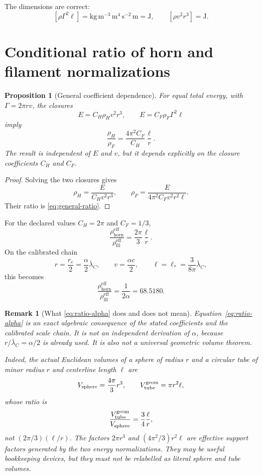 \documentclass[aps,pre,preprint,notitlepage,nofootinbib,superscriptaddress]{revtex4-2}
\newcommand{\lC}{\bar\lambda_C}
\newcommand{\re}{r_e}
\newcommand{\rhohorn}{\rho_{\mathrm{horn}}^{\mathrm{eff}}}
\newcommand{\rhofil}{\rho_{\mathrm{fil}}^{\mathrm{eff}}}
\newtheorem{proposition}{Proposition}
\newtheorem{remark}{Remark}
\begin{document}
The dimensions are correct:
\[
[\rho\Gamma^2\ell]
=
\mathrm{kg\,m^{-3}}\,
\mathrm{m^4\,s^{-2}}\,
\mathrm m
=
\mathrm J,
\qquad
[\rho v^2r^3]=\mathrm J.
\]

\section{Conditional ratio of horn and filament normalizations}
\label{sec:ratio}

\begin{proposition}[General coefficient dependence]
\label{prop:general-ratio}
For equal total energy, with \(\Gamma=2\pi rv\), the closures
\[
E=C_H\rho_Hv^2r^3,
\qquad
E=C_F\rho_F\Gamma^2\ell
\]
imply
\begin{equation}
  \boxed{
  \frac{\rho_H}{\rho_F}
  =
  \frac{4\pi^2C_F}{C_H}\frac{\ell}{r}
  }.
  \label{eq:general-ratio}
\end{equation}
The result is independent of \(E\) and \(v\), but it depends explicitly on the closure coefficients \(C_H\) and \(C_F\).
\end{proposition}

\begin{proof}
Solving the two closures gives
\[
\rho_H=\frac{E}{C_Hv^2r^3},
\qquad
\rho_F
=\frac{E}{4\pi^2C_Fv^2r^2\ell}.
\]
Their ratio is \cref{eq:general-ratio}.
\end{proof}

For the declared values \(C_H=2\pi\) and \(C_F=1/3\),
\begin{equation}
  \frac{\rhohorn}{\rhofil}
  =
  \frac{2\pi}{3}\frac{\ell}{r}.
  \label{eq:specific-ratio}
\end{equation}
On the calibrated chain
\begin{equation}
  r=\frac{\re}{2}
  =\frac{\alpha}{2}\lC,
  \qquad
  v=\frac{\alpha c}{2},
  \qquad
  \ell=\ell_*=\frac{3}{8\pi}\lC,
  \label{eq:calibrated-chain}
\end{equation}
this becomes
\begin{equation}
  \boxed{
  \frac{\rhohorn}{\rhofil}
  =
  \frac{1}{2\alpha}
  =68.5180
  }.
  \label{eq:ratio-alpha}
\end{equation}

\begin{remark}[What \cref{eq:ratio-alpha} does and does not mean]
Equation~\eqref{eq:ratio-alpha} is an exact algebraic consequence of the stated coefficients and the calibrated scale chain.  It is not an independent derivation of \(\alpha\), because \(r/\lC=\alpha/2\) is already used.  It is also not a universal geometric volume theorem.

Indeed, the actual Euclidean volumes of a sphere of radius \(r\) and a circular tube of minor radius \(r\) and centerline length \(\ell\) are
\[
V_{\rm sphere}=\frac{4\pi}{3}r^3,
\qquad
V_{\rm tube}^{\rm geom}=\pi r^2\ell,
\]
whose ratio is
\[
\frac{V_{\rm tube}^{\rm geom}}{V_{\rm sphere}}
=\frac34\frac{\ell}{r},
\]
not \((2\pi/3)(\ell/r)\).  The factors \(2\pi r^3\) and
\((4\pi^2/3)r^2\ell\) are effective support factors generated by the two energy normalizations.  They may be useful bookkeeping devices, but they must not be relabelled as literal sphere and tube volumes.
\end{remark}
\end{document}
